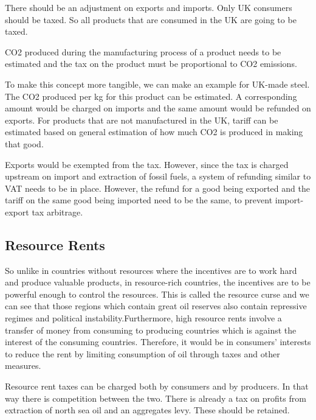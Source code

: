 \documentclass[]{tufte-handout}
\begin{document}
There should be an adjustment on exports and imports. Only UK consumers
should be taxed. So all products that are consumed in the UK are going
to be taxed.

CO2 produced during the manufacturing process of a product needs to be
estimated and the tax on the product must be proportional to CO2
emissions.

To make this concept more tangible, we can make an example for UK-made
steel. The CO2 produced per kg for this product can be estimated. A
corresponding amount would be charged on imports and the same amount
would be refunded on exports. For products that are not manufactured in
the UK, tariff can be estimated based on general estimation of how much
CO2 is produced in making that good.

Exports would be exempted from the tax. However, since the tax is
charged upstream on import and extraction of fossil fuels, a system of
refunding similar to VAT needs to be in place. However, the refund for a
good being exported and the tariff on the same good being imported need
to be the same, to prevent import-export tax arbitrage.

\hypertarget{resource-rents-1}{%
\subsection{Resource Rents}\label{resource-rents-1}}

So unlike in countries without resources where the incentives are to
work hard and produce valuable products, in resource-rich countries, the
incentives are to be powerful enough to control the resources. This is
called the resource curse and we can see that those regions which
contain great oil reserves also contain repressive regimes and political
instability.Furthermore, high resource rents involve a transfer of money
from consuming to producing countries which is against the interest of
the consuming countries. Therefore, it would be in consumers' interests
to reduce the rent by limiting consumption of oil through taxes and
other measures.

Resource rent taxes can be charged both by consumers and by producers.
In that way there is competition between the two. There is already a tax
on profits from extraction of north sea oil and an aggregates levy.
These should be retained.
\end{document}
